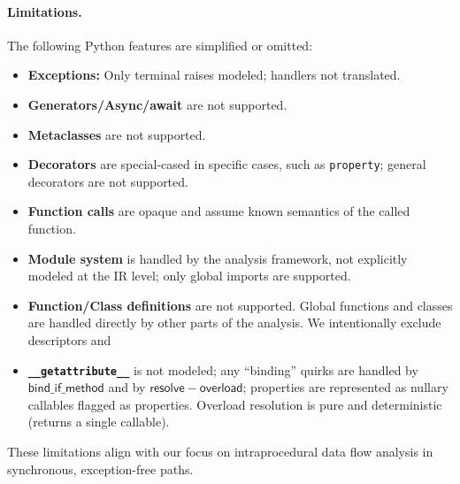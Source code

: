 \paragraph{Limitations.}
The following Python features are simplified or omitted:
\begin{itemize}
\item \textbf{Exceptions:} Only terminal raises modeled; handlers not translated.
\item \textbf{Generators/Async/await} are not supported.
\item \textbf{Metaclasses} are not supported.
\item \textbf{Decorators} are special-cased in specific cases, such as \texttt{property}; general decorators are not supported.
\item \textbf{Function calls} are opaque and assume known semantics of the called function.
\item \textbf{Module system} is handled by the analysis framework, not explicitly modeled at the IR level; only global imports are supported.
\item \textbf{Function/Class definitions} are not supported. Global functions and classes are handled directly by other parts of the analysis.
We intentionally exclude descriptors and
\item \textbf{\texttt{\_\_getattribute\_\_}} is not modeled; any “binding” quirks are handled by \(\mathsf{bind\_if\_method}\) and by \(\mathsf{resolve-overload}\); properties are represented as nullary callables flagged as properties. Overload resolution is pure and deterministic (returns a single callable).
\end{itemize}

These limitations align with our focus on intraprocedural data flow analysis in synchronous, exception-free paths.
